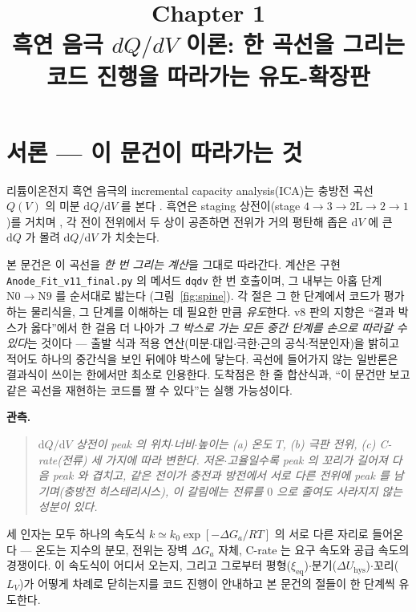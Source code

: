 \documentclass[11pt,a4paper]{article}
\title{\textbf{\LARGE Chapter 1}\\[0.35em]\Large 흑연 음극 $dQ/dV$ 이론: 한 곡선을 그리는 코드 진행을 따라가는 유도-확장판}
\author{}
\date{}
\newcommand{\dd}{\mathrm{d}}
\newcommand{\eq}{\mathrm{eq}}
\newcommand{\hys}{\mathrm{hys}}
\newcommand{\code}[1]{\texttt{#1}}
\begin{document}
\maketitle

\section*{서론 — 이 문건이 따라가는 것}
리튬이온전지 흑연 음극의 incremental capacity analysis(ICA)는 충방전 곡선 $Q(V)$ 의 미분
$\dd Q/\dd V$ 를 본다 \cite{bloom2005,dubarry2012}. 흑연은 staging 상전이(stage
$4\!\to\!3\!\to\!2\mathrm L\!\to\!2\!\to\!1$)를 거치며 \cite{dahn1991,ohzuku1993}, 각 전이 전위에서
두 상이 공존하면 전위가 거의 평탄해 좁은 $\dd V$ 에 큰 $\dd Q$ 가 몰려 $\dd Q/\dd V$ 가 치솟는다.

본 문건은 이 곡선을 \emph{한 번 그리는 계산}을 그대로 따라간다. 계산은 구현 \code{Anode\_Fit\_v11\_final.py}
의 메서드 \code{dqdv} 한 번 호출이며, 그 내부는 아홉 단계 $\mathrm N0\!\to\!\mathrm N9$ 를 순서대로 밟는다
(그림~\ref{fig:spine}). 각 절은 그 한 단계에서 코드가 평가하는 물리식을, 그 단계를 이해하는 데 필요한 만큼
\emph{유도}한다. v8 판의 지향은 ``결과 박스가 옳다''에서 한 걸음 더 나아가 \emph{그 박스로 가는 모든 중간 단계를
손으로 따라갈 수 있다}는 것이다 — 출발 식과 적용 연산(미분$\cdot$대입$\cdot$극한$\cdot$근의 공식$\cdot$적분인자)을
밝히고 적어도 하나의 중간식을 보인 뒤에야 박스에 닿는다. 곡선에 들어가지 않는 일반론은 결과식이 쓰이는 한에서만
최소로 인용한다. 도착점은 한 줄 합산식과, ``이 문건만 보고 같은 곡선을 재현하는 코드를 짤 수 있다''는 실행 가능성이다.

\textbf{관측.}
\begin{quote}\itshape
$\dd Q/\dd V$ 상전이 peak 의 위치$\cdot$너비$\cdot$높이는 (a) 온도 $T$, (b) 극판 전위, (c) C-rate(전류)
세 가지에 따라 변한다. 저온$\cdot$고율일수록 peak 의 꼬리가 길어져 다음 peak 와 겹치고, 같은 전이가 충전과 방전에서
서로 다른 전위에 peak 를 남기며(충방전 히스테리시스), 이 갈림에는 전류를 $0$ 으로 줄여도 사라지지 않는 성분이 있다.
\end{quote}

세 인자는 모두 하나의 속도식 $k\simeq k_0\exp[-\Delta G_a/RT]$ 의 서로 다른 자리로 들어온다 — 온도는 지수의 분모,
전위는 장벽 $\Delta G_a$ 자체, C-rate 는 요구 속도와 공급 속도의 경쟁이다. 이 속도식이 어디서 오는지, 그리고
그로부터 평형($\xi_\eq$)$\cdot$분기($\Delta U_\hys$)$\cdot$꼬리($L_V$)가 어떻게 차례로 닫히는지를 코드 진행이 안내하고
본 문건의 절들이 한 단계씩 유도한다.
\end{document}
